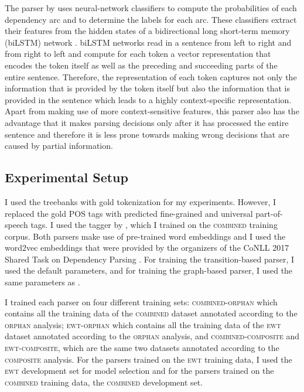 \documentclass[lucida,biblatex]{sp} %
\begin{document}
The parser by \textcite{Dozat2017} uses neural-network classifiers to compute the probabilities of each dependency arc and to determine the labels for each arc. These classifiers extract their features from the hidden states of a bidirectional long short-term memory (biLSTM) network \citep{Schuster1997,Hochreiter1997}. biLSTM networks read in a sentence from left to right and from right to left and compute for each token a vector representation that encodes the token itself as well as the preceding and succeeding parts of the entire sentence. Therefore, the representation of each token captures not only the information that is provided by the token itself but also the information that is provided in the sentence which leads to a highly context-specific representation. Apart from making use of more context-sensitive features, this parser also has the advantage that it makes parsing decisions only after it has processed the entire sentence and therefore it is less prone towards making wrong decisions that are caused by partial information.

\subsection{Experimental Setup}

I used the treebanks with gold tokenization for my experiments. However, I replaced the gold POS tags with predicted fine-grained and universal part-of-speech tags. I used the tagger by \textcite{Dozat2017b}, which I trained on the \textsc{combined} training corpus. Both parsers make use of pre-trained word embeddings and I used the word2vec \citep{Mikolov2013} embeddings that were provided by the organizers of the CoNLL 2017 Shared Task on Dependency Parsing \citep{Zeman2017}. For training the transition-based parser, I used the default parameters, and for training the graph-based parser, I used the same parameters as \textcite{Dozat2017b}.

I trained each parser on four different training sets: \textsc{combined-orphan} which contains all the training data of the \textsc{combined} dataset annotated according to the \textsc{orphan} analysis; \textsc{ewt-orphan} which contains all the training data of the \textsc{ewt} dataset annotated according to the \textsc{orphan} analysis, and \textsc{combined-composite} and \textsc{ewt-composite}, which are the same two datasets annotated according to the \textsc{composite} analysis. For the parsers trained on the \textsc{ewt} training data, I used the \textsc{ewt} development set for model selection and for the parsers trained on the \textsc{combined} training data, the \textsc{combined} development set.
\end{document}
